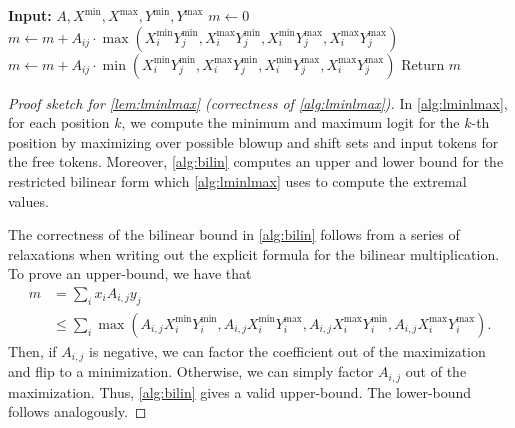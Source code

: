 \begin{algorithm}[h] 
	\caption{Simple algorithm to bound the minimum of $\vec{x} A \vec{y}^T$ for $X^{\min}_i \leq \vec{x}_i \leq X^{\max}_i$ and $Y^{\min}_i \leq \vec{y}_i \leq Y^{\max}_i$.
        To find the maximum, switch the minimum to maximum and vice versa.
    }
	\label{alg:bilin}
	\begin{algorithmic}
            \STATE \textbf{Input:} $A, X^{\min}, X^{\max}, Y^{\min}, Y^{\max}$
            \STATE
            \STATE $m \leftarrow 0$
            \STATE $m \leftarrow m + A_{ij} \cdot \max\left(X^{\min}_i Y^{\min}_j, X^{\max}_i Y^{\min}_j, X^{\min}_i Y^{\max}_j, X^{\max}_i Y^{\max}_j \right)$
            \ELSE
            \STATE $m \leftarrow m + A_{ij} \cdot  \min\left(X^{\min}_i Y^{\min}_j, X^{\max}_i Y^{\min}_j, X^{\min}_i Y^{\max}_j, X^{\max}_i Y^{\max}_j \right)$
            \ENDIF
            \ENDFOR
            \ENDFOR
            \STATE Return $m$
        \end{algorithmic}
\end{algorithm}

\begin{proof}[Proof sketch for \cref{lem:lminlmax} (correctness of \cref{alg:lminlmax})]
	In \cref{alg:lminlmax}, for each position $k$, we compute the minimum and maximum logit for the $k$-th position by maximizing over possible blowup and shift sets and input tokens for the free tokens.
	Moreover, \cref{alg:bilin} computes an upper and lower bound for the restricted bilinear form which \cref{alg:lminlmax} uses to compute the extremal values.

    The correctness of the bilinear bound in \cref{alg:bilin} follows from a series of relaxations when writing out the explicit formula for the bilinear multiplication.
    To prove an upper-bound, we have that 
    \begin{align*}
        m &= \sum_{i} x_i A_{i, j} y_j \\
        &\leq \sum_i \max (A_{i, j} X_i^{\min} Y_i^{\min},  A_{i, j} X_i^{\min} Y_i^{\max}, A_{i, j} X_i^{\max} Y_i^{\min}, A_{i, j} X_i^{\max} Y_i^{\max}).
    \end{align*}
    Then, if $A_{i, j}$ is negative, we can factor the coefficient out of the maximization and flip to a minimization. Otherwise, we can simply factor $A_{i, j}$ out of the maximization.
    Thus, \cref{alg:bilin} gives a valid upper-bound. The lower-bound follows analogously.
\end{proof}

